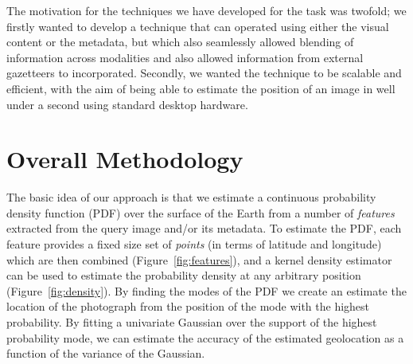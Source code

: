 \documentclass{../acm_proc_article-me11_tweaked}
\begin{document}
The motivation for the techniques we have developed for the task was twofold; we firstly wanted to develop a technique that can operated using either the visual content or the metadata, but which also seamlessly allowed blending of information across modalities and also allowed information from external gazetteers to incorporated. Secondly, we wanted the technique to be scalable and efficient, with the aim of being able to estimate the position of an image in well under a second using standard desktop hardware.

\section{Overall Methodology}\label{sec:meth}
The basic idea of our approach is that we estimate a continuous probability density function (PDF) over the surface of the Earth from a number of \emph{features} extracted from the query image and/or its metadata. To estimate the PDF, each feature provides a fixed size set of \emph{points} (in terms of latitude and longitude) which are then combined (Figure~\ref{fig:features}), and a kernel density estimator can be used to estimate the probability density at any arbitrary position (Figure~\ref{fig:density}). By finding the modes of the PDF we create an estimate the location of the photograph from the position of the mode with the highest probability. By fitting a univariate Gaussian over the support of the highest probability mode, we can estimate the accuracy of the estimated geolocation as a function of the variance of the Gaussian.
\end{document}
